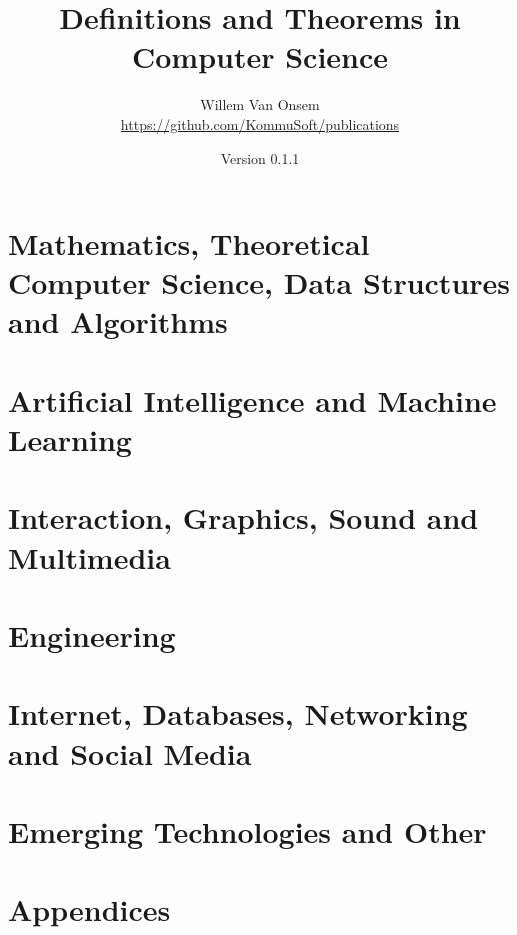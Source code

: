 \documentclass{book}
\title{Definitions and Theorems in Computer Science}
\author{Willem Van Onsem\\\url{https://github.com/KommuSoft/publications}}
\date{Version 0.1.1}
\begin{document}
\frontmatter
\begin{titlepage}
\maketitle
\end{titlepage}
\tableofcontents


\mainmatter

\part{Mathematics, Theoretical Computer Science, Data Structures and Algorithms}










\part{Artificial Intelligence and Machine Learning}











\part{Interaction, Graphics, Sound and Multimedia}






\part{Engineering}







\part{Internet, Databases, Networking and Social Media}








\part{Emerging Technologies and Other}




\appendix
\backmatter

\part{Appendices}

\begin{twocolumn}


\printindex
\end{twocolumn}
\end{document}
